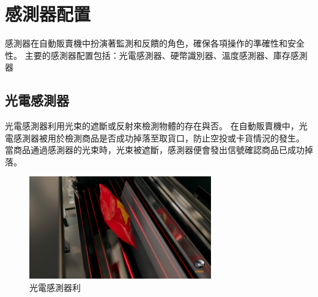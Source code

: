 \documentclass[12pt]{article}       %
\begin{document}
\section{\centering 感測器配置}
\hspace{2em}
感測器在自動販賣機中扮演著監測和反饋的角色，確保各項操作的準確性和安全性。
主要的感測器配置包括：光電感測器、硬幣識別器、溫度感測器、庫存感測器

\subsection{光電感測器} 
\hspace{2em}
光電感測器利用光束的遮斷或反射來檢測物體的存在與否。
在自動販賣機中，光電感測器被用於檢測商品是否成功掉落至取貨口，防止空投或卡貨情況的發生。
當商品通過感測器的光束時，光束被遮斷，感測器便會發出信號確認商品已成功掉落。
\begin{figure}[H]
    \centering
    \includegraphics[width=0.7\textwidth]{20181217-113730_U13613_M484183_3853.png}     %
    \caption{光電感測器利\cite{storm_vending_machine_2019}}    %
    \label{fig:example6}    %
\end{figure} 
\end{document}

